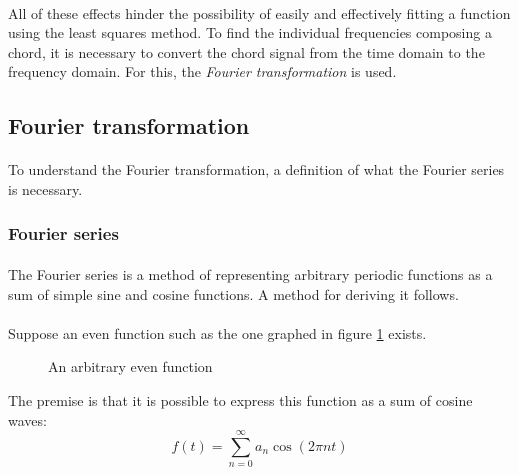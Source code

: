 \documentclass{article}
\begin{document}
\paragraph*{}
All of these effects hinder the possibility of easily and effectively fitting 
a function using the least squares method. To find the individual frequencies 
composing a chord, it is necessary to convert the chord signal from the time 
domain to the frequency domain. For this, the \textit{Fourier transformation} 
is used.

\subsection{Fourier transformation}

\paragraph*{}
To understand the Fourier transformation, a definition of what the Fourier 
series is necessary.

\subsubsection{Fourier series}

\paragraph*{}
The Fourier series is a method of representing arbitrary periodic functions as 
a sum of simple sine and cosine functions. A method for deriving it follows.

\paragraph*{}
Suppose an even function such as the one graphed in figure 
\ref{fig:odd-arb-func} exists.
\begin{figure}[ht]
	\centering
	\caption{An arbitrary even function}
	\label{fig:odd-arb-func}
\end{figure}

The premise is that it is possible to express this function as a sum of cosine 
waves:
$$f(t) = \sum^{\infty}_{n=0}a_n \cos(2 \pi n t)$$
\end{document}

